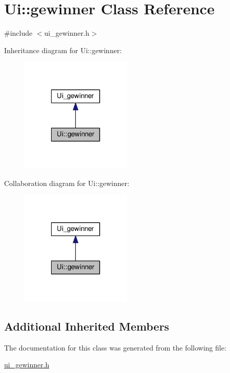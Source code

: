 \hypertarget{classUi_1_1gewinner}{\section{Ui\-:\-:gewinner Class Reference}
\label{classUi_1_1gewinner}
}


{\ttfamily \#include $<$ui\-\_\-gewinner.\-h$>$}



Inheritance diagram for Ui\-:\-:gewinner\-:\nopagebreak
\begin{figure}[H]
\begin{center}
\leavevmode
\includegraphics[width=150pt]{classUi_1_1gewinner__inherit__graph}
\end{center}
\end{figure}


Collaboration diagram for Ui\-:\-:gewinner\-:\nopagebreak
\begin{figure}[H]
\begin{center}
\leavevmode
\includegraphics[width=150pt]{classUi_1_1gewinner__coll__graph}
\end{center}
\end{figure}
\subsection*{Additional Inherited Members}


The documentation for this class was generated from the following file\-:\begin{DoxyCompactItemize}
\item 
\hyperlink{ui__gewinner_8h}{ui\-\_\-gewinner.\-h}\end{DoxyCompactItemize}
